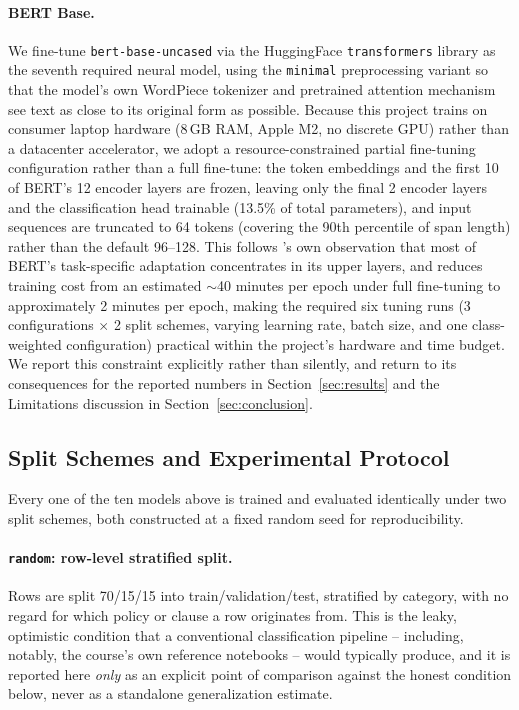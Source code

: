 \documentclass[11pt]{acl}
\begin{document}
\paragraph{BERT Base.} We fine-tune \texttt{bert-base-uncased}
\cite{devlin-etal-2019-bert} via the HuggingFace \texttt{transformers} library as the
seventh required neural model, using the \texttt{minimal} preprocessing variant so that
the model's own WordPiece tokenizer and pretrained attention mechanism see text as close
to its original form as possible. Because this project trains on consumer laptop
hardware (8\,GB RAM, Apple M2, no discrete GPU) rather than a datacenter accelerator, we
adopt a resource-constrained partial fine-tuning configuration rather than a full
fine-tune: the token embeddings and the first 10 of BERT's 12 encoder layers are
frozen, leaving only the final 2 encoder layers and the classification head trainable
(13.5\% of total parameters), and input sequences are truncated to 64 tokens (covering
the 90th percentile of span length) rather than the default 96--128. This follows
\citet{devlin-etal-2019-bert}'s own observation that most of BERT's task-specific
adaptation concentrates in its upper layers, and reduces training cost from an
estimated ${\sim}$40 minutes per epoch under full fine-tuning to approximately 2 minutes
per epoch, making the required six tuning runs (3 configurations $\times$ 2 split
schemes, varying learning rate, batch size, and one class-weighted configuration)
practical within the project's hardware and time budget. We report this constraint
explicitly rather than silently, and return to its consequences for the reported
numbers in Section~\ref{sec:results} and the Limitations discussion in
Section~\ref{sec:conclusion}.

\subsection{Split Schemes and Experimental Protocol}
\label{sec:protocol}

Every one of the ten models above is trained and evaluated identically under two split
schemes, both constructed at a fixed random seed for reproducibility.

\paragraph{\texttt{random}: row-level stratified split.} Rows are split
70/15/15 into train/validation/test, stratified by category, with no regard for which
policy or clause a row originates from. This is the leaky, optimistic condition that a
conventional classification pipeline -- including, notably, the course's own reference
notebooks -- would typically produce, and it is reported here \emph{only} as an explicit
point of comparison against the honest condition below, never as a standalone
generalization estimate.
\end{document}
